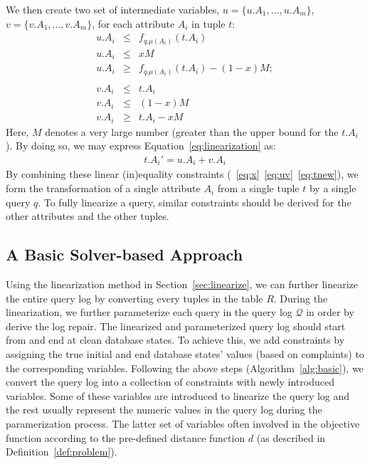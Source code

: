 We then create two set of intermediate variables,
$u=\{u.A_1, ..., u.A_m\}$, $v = \{v.A_1, ..., v.A_m\}$, 
for each attribute $A_i$ in tuple $t$:
\begin{eqnarray}
\label{eq:uv}
u.A_i &\leq & f_{q.\mu(A_i)} (t.A_i) \nonumber\\
u.A_i &\leq & xM \nonumber\\ 
u.A_i &\geq & f_{q.\mu(A_i)} (t.A_i) - (1-x)M ; \nonumber \\\nonumber \\
v.A_i &\leq & t.A_i \nonumber\\
v.A_i &\leq & (1-x)M \nonumber\\
v.A_i &\geq & t.A_i - xM
\end{eqnarray}
Here, $M$ denotes a very large number (greater than the upper bound for the $t.A_i$).
By doing so, we may express Equation~\ref{eq:linearization} as:
\begin{eqnarray}
\label{eq:tnew}
t.A_i' = u.A_i + v.A_i
\end{eqnarray}
By combining these linear (in)equality constraints 
(~\ref{eq:x}~\ref{eq:uv}~\ref{eq:tnew}), we form the transformation 
of a single attribute $A_i$ from a single tuple $t$ 
by a single query $q$. To fully linearize a query, 
similar constraints should be
derived for the other attributes and the other tuples. 


\subsection{A Basic Solver-based Approach}
\label{sec:milp}
Using the linearization
 method in Section~\ref{sec:linearize}, we can further
linearize
the entire query log by converting every tuples in the table $R$. 
During the linearization, we further parameterize each
query in the query log $\mathcal{Q}$ in order by 
derive the log repair. 
The linearized and parameterized query log
should start from and end at clean database states.
To achieve this, we add constraints
by assigning the true initial and end database 
states' values (based on complaints) 
to the corresponding variables. 
Following the above steps 
(Algorithm~\ref{alg:basic}), we convert the 
query log into a collection of constraints 
with newly introduced variables. 
Some of these variables
are introduced to linearize the query log 
and the rest usually
represent the numeric values in the query log
during the paramerization process. 
The latter set of 
variables often involved in the objective function 
according to the pre-defined distance function $d$ 
(as described in Definition~\ref{def:problem}). \\


